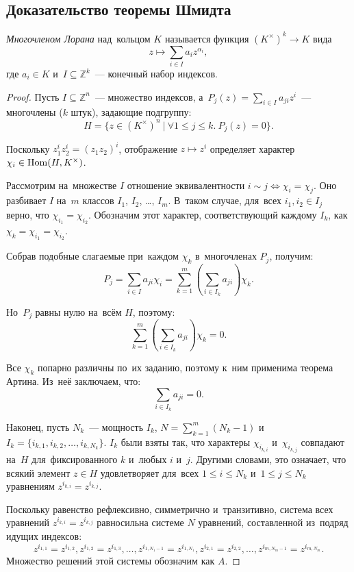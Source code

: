 \documentclass[a4paper,oneside]{article}
\begin{document}
\subsection{Доказательство теоремы Шмидта}
\textit{Многочленом Лорана} над~кольцом $K$ называется функция $(K^\times)^k \rightarrow K$ вида
\[
  z \mapsto \sum_{i \in I} a_i z^{\alpha_i},
\]
где $a_i \in K$ и~$I \subseteq \mathbb{Z}^k$~— конечный набор индексов.

\begin{proof}
  Пусть $I \subseteq \mathbb{Z}^n$~— множество индексов,
  а~$P_j(z) = \sum_{i \in I} a_{ji} z^i$~— многочлены ($k$ штук), задающие подгруппу:
  \[
    H = \{ z \in (K^{\times})^n\ |\ \forall 1 \leq j \leq k.\ P_j(z) = 0 \}.
  \]

  Поскольку $z_1^{i} z_2^{i} = (z_1 z_2)^i$, отображение $z \mapsto z^i$ определяет
  характер $\chi_i \in \mathrm{Hom}(H, K^{\times})$.

  Рассмотрим на~множестве $I$ отношение эквивалентности $i \sim j \Leftrightarrow \chi_i = \chi_j$.
  Оно разбивает $I$ на~$m$ классов $I_1$, $I_2$, …, $I_m$. В~таком случае, для~всех $i_1, i_2 \in I_j$ верно, что $\chi_{i_1} = \chi_{i_2}$.
  Обозначим этот характер, соответствующий каждому $I_k$, как $\chi_k = \chi_{i_1} = \chi_{i_2}$.

  Собрав подобные слагаемые при~каждом $\chi_k$ в~многочленах $P_j$, получим:
  \[
    P_j = \sum_{i \in I} a_{ji} \chi_i = \sum_{k = 1}^{m} \left( \sum_{i \in I_k} a_{ji} \right) \chi_k.
  \]

  Но~$P_j$ равны нулю на~всём $H$, поэтому:
  \[
    \sum_{k = 1}^{m} \left( \sum_{i \in I_k} a_{ji} \right) \chi_k = 0.
  \]

  Все $\chi_k$ попарно различны по~их заданию, поэтому к~ним применима теорема Артина. Из~неё заключаем, что:
  \[
    \sum_{i \in I_k} a_{ji} = 0.
  \]

  Наконец, пусть $N_k$~— мощность $I_k$, $N = \sum_{k = 1}^m (N_k - 1)$ и~$I_k = \{i_{k, 1},\allowbreak i_{k, 2},\allowbreak \ldots,\allowbreak i_{k, N_k}\}$.
  $I_k$ были взяты так, что характеры $\chi_{i_{k, i}}$ и~$\chi_{i_{k, j}}$ совпадают на~$H$ для~фиксированного $k$ и~любых $i$ и~$j$.
  Другими словами, это означает, что всякий элемент $z \in H$ удовлетворяет для~всех $1 \leq i \leq N_k$ и~$1 \leq j \leq N_k$
  уравнениям $z^{i_{k, i}} = z^{i_{k, j}}$.

  Поскольку равенство рефлексивно, симметрично и~транзитивно, система всех уравнений $z^{i_{k, i}} = z^{i_{k, j}}$ равносильна
  системе $N$ уравнений, составленной из~подряд идущих индексов:
  \[
    z^{i_{1, 1}} = z^{i_{1, 2}}, z^{i_{1, 2}} = z^{i_{1, 3}}, \ldots, z^{i_{1, N_1 - 1}} = z^{i_{1, N_1}}, z^{i_{2, 1}} = z^{i_{2, 2}}, \ldots, z^{i_{m, N_m - 1}} = z^{i_{m, N_m}}.
  \]
  Множество решений этой системы обозначим как $A$.


\end{proof}
\end{document}
